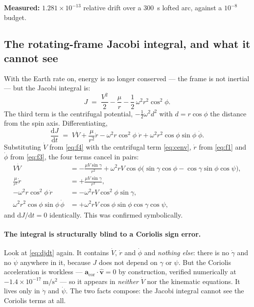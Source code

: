 \documentclass[11pt]{article}
\newcommand{\vhat}{\hat{\mathbf{v}}}
\newcommand{\dd}{\mathrm{d}}
\begin{document}
\textbf{Measured:} $1.281\times10^{-13}$ relative drift over a 300~s lofted
arc, against a $10^{-8}$ budget.

\subsection{The rotating-frame Jacobi integral, and what it cannot see}
\label{sec:jacobi}

With the Earth rate on, energy is no longer conserved --- the frame is not
inertial --- but the Jacobi integral is:
\begin{equation}
  J \;=\; \frac{V^2}{2} - \frac{\mu}{r}
        - \frac{1}{2}\,\omega^2 r^2\cos^2\!\phi .
  \label{eq:jacobi}
\end{equation}
The third term is the centrifugal potential, $-\tfrac12\omega^2 d^2$ with
$d = r\cos\phi$ the distance from the spin axis. Differentiating,
\begin{equation}
  \frac{\dd J}{\dd t} \;=\; V\dot V + \frac{\mu}{r^2}\dot r
   - \omega^2 r\cos^2\!\phi\;\dot r
   + \omega^2 r^2\cos\phi\sin\phi\;\dot\phi .
  \label{eq:djdt}
\end{equation}
Substituting $\dot V$ from \eqref{eq:f4} with the centrifugal term
\eqref{eq:cenv}, $\dot r$ from \eqref{eq:f1} and $\dot\phi$ from
\eqref{eq:f3}, the four terms cancel in pairs:
\begin{align}
  V\dot V &= -\frac{\mu V\sin\gamma}{r^2}
             + \omega^2 r V\cos\phi\bigl(\sin\gamma\cos\phi
             - \cos\gamma\sin\phi\cos\psi\bigr), \nonumber\\
  \frac{\mu}{r^2}\dot r &= +\frac{\mu V\sin\gamma}{r^2}, \nonumber\\
  -\omega^2 r\cos^2\!\phi\,\dot r &= -\omega^2 r V\cos^2\!\phi\sin\gamma, \nonumber\\
  \omega^2 r^2\cos\phi\sin\phi\,\dot\phi
    &= +\omega^2 r V\cos\phi\sin\phi\cos\gamma\cos\psi ,
\end{align}
and $\dd J/\dd t = 0$ identically. This was confirmed symbolically.

\paragraph{The integral is structurally blind to a Coriolis sign error.}
Look at \eqref{eq:djdt} again. It contains $\dot V$, $\dot r$ and $\dot\phi$
and \emph{nothing else}: there is no $\dot\gamma$ and no $\dot\psi$ anywhere in
it, because $J$ does not depend on $\gamma$ or $\psi$. But the Coriolis
acceleration is workless --- $\mathbf{a}_{\text{cor}}\cdot\vhat = 0$ by
construction, verified numerically at $-1.4\times10^{-17}~\mathrm{m/s^2}$ ---
so it appears in \emph{neither} $\dot V$ nor the kinematic equations. It lives
only in $\dot\gamma$ and $\dot\psi$. The two facts compose: the Jacobi integral
cannot see the Coriolis terms at all.
\end{document}

